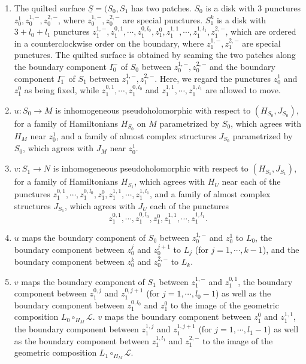 \documentclass{amsart}
\numberwithin{equation}{section}
\numberwithin{figure}{section}
\begin{document}
\begin{enumerate}[label=(\roman*)]

\item The quilted surface $\underline{S} = (S_{0}, S_{1}$ has two patches. $S_{0}$ is a disk with $3$ punctures $z_{0}^{1}, z_{0}^{1, -}, z_{0}^{2, -}$, where $z_{0}^{1, -}, z_{0}^{2, -}$ are special punctures. $S_{1}^{k}$ is a disk with $3 + l_{0} + l_{1}$ punctures $z_{1}^{1, -}, z_{1}^{0, 1}, \cdots, z_{1}^{0, l_{0}}, z_{1}^{0}, z_{1}^{1, 1}, \cdots, z_{1}^{1, l_{1}}, z_{1}^{2, -}$, which are ordered in a counterclockwise order on the boundary, where $z_{1}^{1, -}, z_{1}^{2, -}$ are special punctures. 
The quilted surface is obtained by seaming the two patches along the boundary component $I_{0}^{-}$ of $S_{0}$ between $z_{0}^{1, -}, z_{0}^{2, -}$ and the boundary component $I_{1}^{-}$ of $S_{1}$ between $z_{1}^{1, -}, z_{1}^{2, -}$. Here, we regard the punctures $z_{0}^{1}$ and $z_{1}^{0}$ as being fixed, while $z_{1}^{0, 1}, \cdots, z_{1}^{0, l_{0}}$ and $z_{1}^{1, 1}, \cdots, z_{1}^{1, l_{1}}$ are allowed to move.

\item $u: S_{0} \to M$ is inhomogeneous pseudoholomorphic with respect to $(H_{S_{0}}, J_{S_{0}})$, for a family of Hamiltonians $H_{S_{0}}$ on $M$ parametrized by $S_{0}$, which agrees with $H_{M}$ near $z_{0}^{1}$, and a family of almost complex structures $J_{S_{0}}$ parametrized by $S_{0}$, which agrees with $J_{M}$ near $z_{0}^{1}$.

\item $v: S_{1} \to N$ is inhomogeneous pseudoholomorphic with respect to $(H_{S_{1}}, J_{S_{1}})$, for a family of Hamiltonians $H_{S_{1}}$, which agrees with $H_{U}$ near each of the punctures $z_{1}^{0, 1}, \cdots, z_{1}^{0, l_{0}}, z_{1}^{0}, z_{1}^{1, 1}, \cdots, z_{1}^{1, l_{1}}$, and a family of almost complex structures $J_{S_{1}}$, which agrees with $J_{U}$ each of the punctures $$z_{1}^{0, 1}, \cdots, z_{1}^{0, l_{0}}, z_{1}^{0}, z_{1}^{1, 1}, \cdots, z_{1}^{1, l_{1}}.$$

\item $u$ maps the boundary component of $S_{0}$ between $z_{0}^{1, -}$ and $z_{0}^{1}$ to $L_{0}$, the boundary component between $z_{0}^{j}$ and $z_{0}^{j+1}$ to $L_{j}$ (for $j = 1, \cdots, k-1$), and the boundary component between $z_{0}^{k}$ and $z_{0}^{2, -}$ to $L_{k}$.

\item $v$ maps the boundary component of $S_{1}$ between $z_{1}^{1, -}$ and $z_{1}^{0, 1}$, the boundary component between $z_{1}^{0, j}$ and $z_{1}^{0, j+1}$ (for $j = 1, \cdots, l_{0}-1$) as well as the boundary component between $z_{1}^{0, l_{0}}$ and $z_{1}^{0}$ to the image of the geometric composition $L_{0} \circ_{H_{M}} \mathcal{L}$. $v$ maps the boundary component between $z_{1}^{0}$ and $z_{1}^{1, 1}$, the boundary component between $z_{1}^{1, j}$ and $z_{1}^{1, j+1}$ (for $j = 1, \cdots, l_{1}-1$) as well as the boundary component between $z_{1}^{1, l_{1}}$ and $z_{1}^{2, -}$ to the image of the geometric composition $L_{1} \circ_{H_{M}} \mathcal{L}$.


\end{enumerate}
\end{document}
